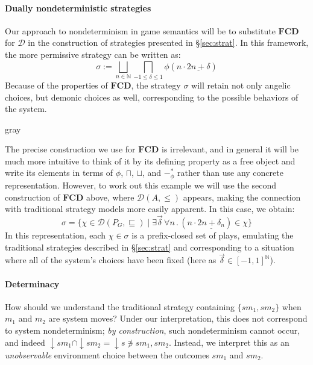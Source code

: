 \documentclass[format=sigplan,authordraft]{acmart}
\begin{document}
\paragraph{Dually nondeterministic strategies} %

Our approach to nondeterminism in game semantics
will be to substitute $\mathbf{FCD}$ for $\mathcal{D}$
in the construction of strategies presented in \S\ref{sec:strat}.
In this framework,
the more permissive strategy
can be written as:
\[
  \sigma :=
    \bigsqcup_{n \in \mathbb{N}}
    \bigsqcap_{-1 \le \delta \le 1}
    \phi(n \cdot \underline{2n + \delta})
\]
Because of the properties of $\mathbf{FCD}$,
the strategy $\sigma$ will retain
not only angelic choices,
but demonic choices as well,
corresponding to the possible behaviors
of the system.

\begin{color}{gray}

The precise construction we use for $\mathbf{FCD}$ is irrelevant,
and in general it will be much more intuitive
to think of it by its defining property as a free object and
write its elements in terms of $\phi$, $\sqcap$, $\sqcup$, and $-_\phi^*$
rather than use any concrete representation.
However, to work out this example
we will use the second construction of $\mathbf{FCD}$ above,
where $\mathcal{D}(A, {\le})$ appears,
making the connection with traditional strategy models
more easily apparent.
In this case, we obtain:
\[
    \sigma =
    \{ \chi \in \mathcal{D}(P_G, {\sqsubseteq}) \mid
       \exists \vec{\delta} \,
       \forall n \,.\,
       (n \cdot \underline{2n + \delta_n}) \in \chi \}
\]
In this representation,
each $\chi \in \sigma$
is a prefix-closed set of plays,
emulating the traditional strategies described in \S\ref{sec:strat}
and corresponding to a situation where all of the system's choices
have been fixed (here as $\vec{\delta} \in [-1,1]^\mathbb{N}$).

\end{color}


\paragraph{Determinacy} %

How should we understand
the traditional strategy containing $\{ sm_1, sm_2 \}$
when $m_1$ and $m_2$ are system moves?
Under our interpretation,
this does not correspond to
system nondeterminism;
\emph{by construction},
such nondeterminism cannot occur,
and indeed
${\downarrow} s m_1 \cap {\downarrow} s m_2 =
 {\downarrow} s \notni
 s m_1, s m_2$.
Instead,
we interpret this as an \emph{unobservable}
environment choice
between the outcomes $s m_1$ and $s m_2$.
\end{document}
